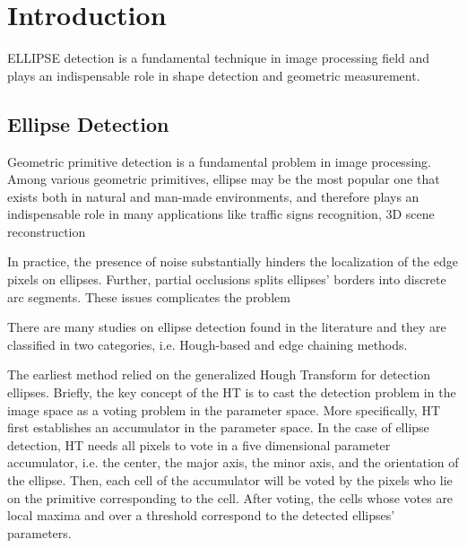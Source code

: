 \documentclass[a4paper]{report}
\begin{document}
\section{Introduction}


ELLIPSE detection is a fundamental technique in image processing field and plays an indispensable role in shape
detection and geometric measurement.


\subsection{Ellipse Detection}
Geometric primitive detection is a fundamental problem in image processing. Among various geometric primitives, ellipse may be the most popular one that exists both in natural and man-made environments, and therefore plays an indispensable role in many applications like traffic signs recognition, 3D scene reconstruction


In practice, the presence of noise substantially hinders the localization of the edge pixels on ellipses. Further, partial occlusions splits ellipses' borders into discrete arc segments. These issues complicates the problem 


There are many studies on ellipse detection found in the literature and
they are classified in two categories, i.e. Hough-based and edge chaining methods.

The earliest method relied on the generalized Hough Transform for detection ellipses. Briefly,
the key concept of the HT is to cast the detection problem in the image space as a voting problem in the parameter space. More specifically, HT first establishes an accumulator in the parameter space. In the case of ellipse detection, HT needs all pixels to vote in a five dimensional parameter accumulator, i.e. the center, the major axis, the minor axis, and the orientation of the ellipse. Then, each cell of the accumulator will be voted by the pixels who lie on the primitive corresponding to the cell. 
After voting, the cells whose votes are local maxima and over a threshold correspond to the detected ellipses' parameters.
\end{document}
